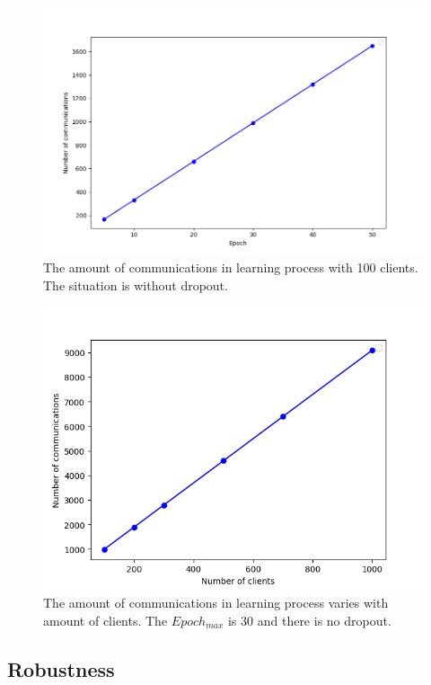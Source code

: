 \begin{figure}[!ht]
    \centering
    \includegraphics[width=\columnwidth]{img/comm-epoch.png}
    \caption{The amount of communications in learning process with 100 clients. The situation is without dropout.}
    \label{comm-epoch}
\end{figure}

\begin{figure}[!ht]
    \centering
    \includegraphics[width=\columnwidth]{img/comm-client.png}
    \caption{The amount of communications in learning process varies with amount of clients. The $Epoch_{max}$ is 30 and there is no dropout.}
    \label{comm-client}
\end{figure}


\subsection{Robustness}
